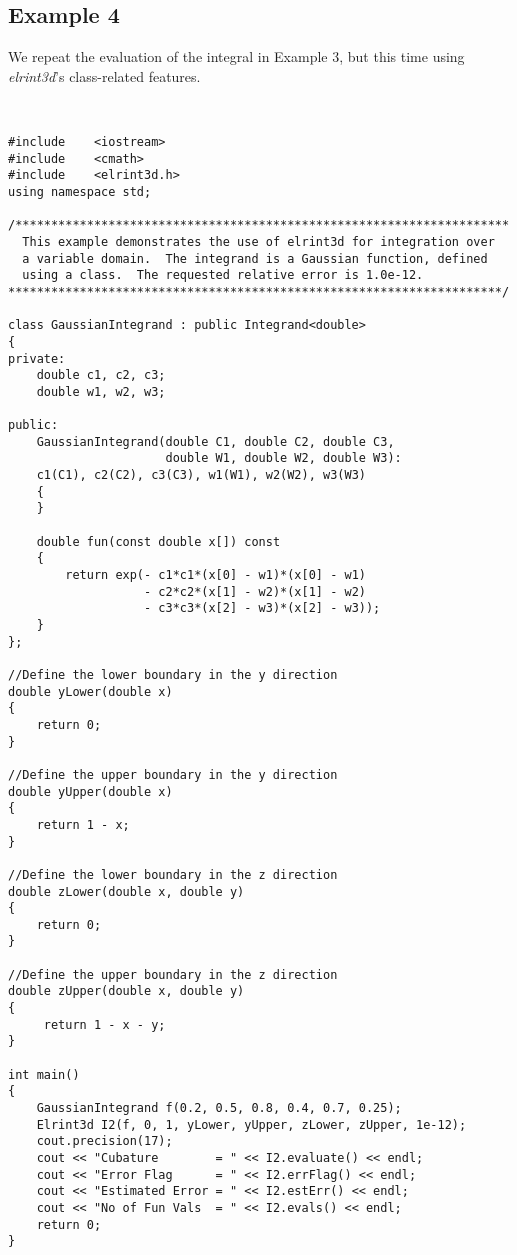\documentclass[10pt]{article}
\def \algorithmNoSpace {\textit{elrint3d}}
\begin{document}
\subsection{Example 4}

We repeat the evaluation of the integral in Example 3, but this time using {\algorithmNoSpace}'s class-related features.

\ 

\begin{verbatim}
#include    <iostream>
#include    <cmath>
#include    <elrint3d.h>
using namespace std;

/*********************************************************************
  This example demonstrates the use of elrint3d for integration over 
  a variable domain.  The integrand is a Gaussian function, defined
  using a class.  The requested relative error is 1.0e-12.
*********************************************************************/

class GaussianIntegrand : public Integrand<double>
{
private:
    double c1, c2, c3;
    double w1, w2, w3;
   
public:
    GaussianIntegrand(double C1, double C2, double C3, 
                      double W1, double W2, double W3):
    c1(C1), c2(C2), c3(C3), w1(W1), w2(W2), w3(W3)
    {
    }

    double fun(const double x[]) const
    {    
        return exp(- c1*c1*(x[0] - w1)*(x[0] - w1)
                   - c2*c2*(x[1] - w2)*(x[1] - w2)
                   - c3*c3*(x[2] - w3)*(x[2] - w3));
    }
};

//Define the lower boundary in the y direction
double yLower(double x)
{
    return 0;
}

//Define the upper boundary in the y direction
double yUpper(double x)
{
    return 1 - x;
}

//Define the lower boundary in the z direction
double zLower(double x, double y)
{
    return 0;
}

//Define the upper boundary in the z direction
double zUpper(double x, double y)
{
     return 1 - x - y;
}

int main()
{
    GaussianIntegrand f(0.2, 0.5, 0.8, 0.4, 0.7, 0.25);
    Elrint3d I2(f, 0, 1, yLower, yUpper, zLower, zUpper, 1e-12);
    cout.precision(17);
    cout << "Cubature        = " << I2.evaluate() << endl;
    cout << "Error Flag      = " << I2.errFlag() << endl;
    cout << "Estimated Error = " << I2.estErr() << endl;
    cout << "No of Fun Vals  = " << I2.evals() << endl;
    return 0;
}
\end{verbatim}
\end{document}
